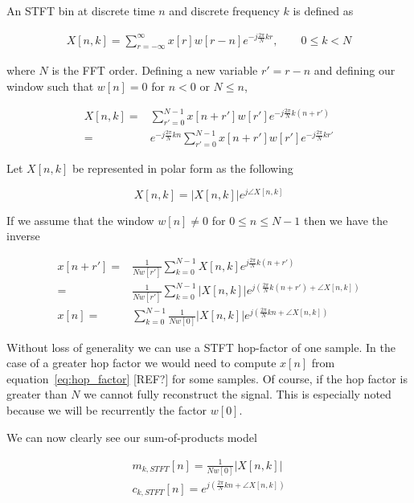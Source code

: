 \documentclass [11pt, proquest,oneside] {uwthesis}[2015/03/03]
\begin{document}
An STFT bin at discrete time $n$ and discrete frequency $k$ is defined as

\begin{align}
\label{eq:STFTdefinition}
X[n,k] = \sum\limits_{r=-\infty}^{\infty} x[r] w[r - n] e^{-j\frac{2\pi}{N}kr}, \qquad 0 \leq k < N
\end{align}

where $N$ is the FFT order.  Defining a new variable $r' = r - n$ and defining our window such that  $w[n] = 0$ for $n < 0$ or $N \leq n$,

\begin{align}
X[n,k] =& \sum\limits_{r'=0}^{N-1} x[n + r'] w[r'] e^{-j\frac{2\pi}{N}k(n + r')} \nonumber \\
=& e^{-j\frac{2\pi}{N}kn} \sum\limits_{r'=0}^{N-1} x[n + r'] w[r'] e^{-j\frac{2\pi}{N}kr'}
\end{align}

Let $X[n,k]$ be represented in polar form as the following

\begin{equation}
X[n,k] = \vert X[n,k]\vert e^{j\angle X[n,k]}
\end{equation}

If we assume that the window $w[n] \neq 0$ for $0 \leq n \leq N-1$ then we have the inverse

\begin{align}
\label{eq:hop_factor}
x[n + r'] =& \frac{1}{Nw[r']}  \sum\limits_{k=0}^{N-1} X[n,k] e^{j\frac{2\pi}{N}k(n+r')} \nonumber \\
=& \frac{1}{Nw[r']}  \sum\limits_{k=0}^{N-1} \vert X[n,k]\vert e^{j(\frac{2\pi}{N}k(n+r') + \angle X[n,k])} \\
x[n] =&\sum\limits_{k=0}^{N-1}  \frac{1}{Nw[0]}  \vert X[n,k]\vert e^{j(\frac{2\pi}{N}kn + \angle X[n,k])}
\end{align}

Without loss of generality we can use a STFT hop-factor of one sample.  In the case of a greater hop factor we would need to compute $x[n]$ from equation~\ref{eq:hop_factor} [REF?] for some samples.  Of course, if the hop factor is greater than $N$ we cannot fully reconstruct the signal.  This is especially noted because we will be recurrently the factor $w[0]$.

We can now clearly see our sum-of-products model

\begin{align}
\label{eq:envelope_STFT}
m_{k,STFT}[n] =  \frac{1}{Nw[0]}  \vert X[n,k]\vert \\
c_{k,STFT}[n] = e^{j(\frac{2\pi}{N}kn + \angle X[n,k])}
\end{align}
\end{document}
